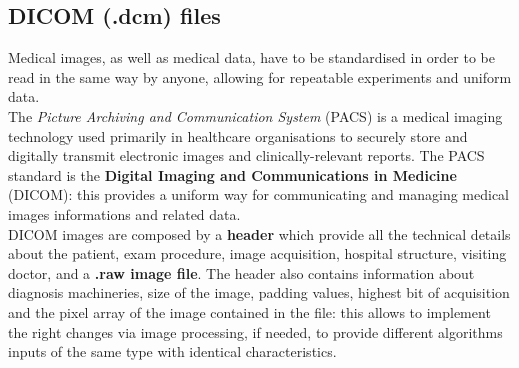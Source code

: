 \documentclass[../main.tex]{subfiles}
\begin{document}
\subsection{DICOM (.dcm) files} %
Medical images, as well as medical data, have to be standardised in order to be read in the same way by anyone, allowing for repeatable experiments and uniform data. \\
The \textit{Picture Archiving and Communication System} (PACS) is a medical imaging technology used primarily in healthcare organisations to securely store and digitally transmit electronic images and clinically-relevant reports. The PACS standard is the \textbf{Digital Imaging and Communications in Medicine} (DICOM): this provides a uniform way for communicating and managing medical images informations and related data. \\
DICOM images are composed by a \textbf{header} which provide all the technical details about the patient, exam procedure, image acquisition, hospital structure, visiting doctor, and a \textbf{.raw image file}. The header also contains information about diagnosis machineries, size of the image, padding values, highest bit of acquisition and the pixel array of the image contained in the file: this allows to implement the right changes via image processing, if needed, to provide different algorithms inputs of the same type with identical characteristics.
\vspace{5mm}
\end{document}
